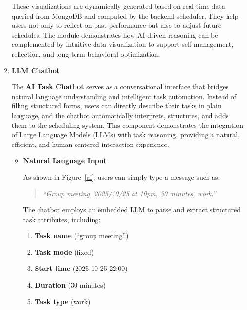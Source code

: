 \documentclass[12pt, a4paper]{article}
\begin{document}
\begin{enumerate}
\begin{itemize}
                    \end{itemize}
                    
                    These visualizations are dynamically generated based on real-time data queried from MongoDB and computed by the backend scheduler. They help users not only to reflect on past performance but also to adjust future schedules. The module demonstrates how AI-driven reasoning can be complemented by intuitive data visualization to support self-management, reflection, and long-term behavioral optimization.
                    
                                    
                \item \textbf{LLM Chatbot}
                
                    The \textbf{AI Task Chatbot} serves as a conversational interface that bridges natural language understanding and intelligent task automation. Instead of filling structured forms, users can directly describe their tasks in plain language, and the chatbot automatically interprets, structures, and adds them to the scheduling system. This component demonstrates the integration of Large Language Models (LLMs) with task reasoning, providing a natural, efficient, and human-centered interaction experience.

                    \begin{itemize}
                        \item \textbf{Natural Language Input}  

                            As shown in Figure~\ref{ai}, users can simply type a message such as:
                            
                            \begin{quote}
                                \textit{“Group meeting, 2025/10/25 at 10pm, 30 minutes, work.”}
                            \end{quote}
                            
                            The chatbot employs an embedded LLM to parse and extract structured task attributes, including:
                            
                            \begin{enumerate}
                                \item \textbf{Task name} (“group meeting”)
                                \item \textbf{Task mode} (fixed)
                                \item \textbf{Start time} (2025-10-25 22:00)
                                \item \textbf{Duration} (30 minutes)
                                \item \textbf{Task type} (work)
                            \end{enumerate}


\end{itemize}
\end{enumerate}
\end{document}
